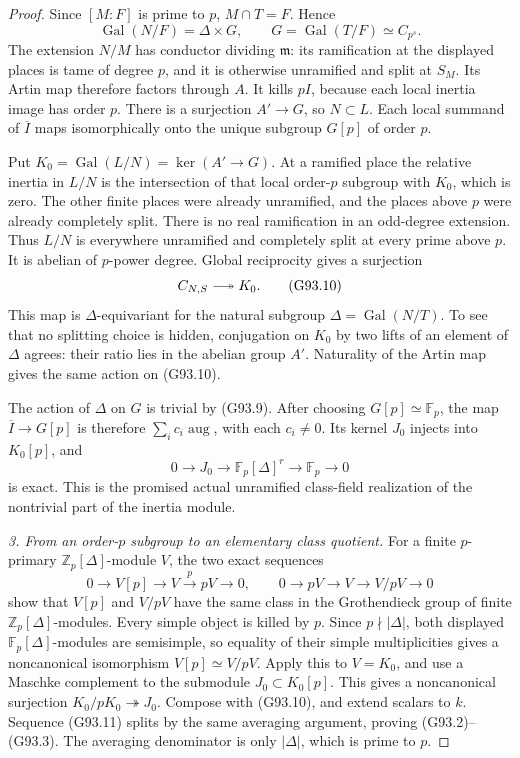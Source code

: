 \begin{proof}
Since \([M:F]\) is prime to \(p\), \(M\cap T=F\).  Hence
\[
 \operatorname{Gal}(N/F)=\Delta\times G,
 \qquad G=\operatorname{Gal}(T/F)\simeq C_{p^s}.
 \tag{G93.9}
\]
The extension \(N/M\) has conductor dividing \(\mathfrak m\):
its ramification at the displayed places is tame of degree \(p\),
and it is otherwise unramified and split at \(S_M\).
Its Artin map therefore factors through \(A\).  It kills \(pI\),
because each local inertia image has order \(p\).
There is a surjection \(A'\to G\), so \(N\subset L\).
Each local summand of \(\overline I\) maps isomorphically onto
the unique subgroup \(G[p]\) of order \(p\).

Put \(K_0=\operatorname{Gal}(L/N)=\ker(A'\to G)\).
At a ramified place the relative inertia in \(L/N\) is the
intersection of that local order-\(p\) subgroup with \(K_0\),
which is zero.  The other finite places were already unramified,
and the places above \(p\) were already completely split.
There is no real ramification in an odd-degree extension.
Thus \(L/N\) is everywhere unramified and completely split at
every prime above \(p\).  It is abelian of \(p\)-power degree.
Global reciprocity gives a surjection
\[
 C_{N,S}\longtwoheadrightarrow K_0.
 \tag{G93.10}
\]
This map is \(\Delta\)-equivariant for the natural subgroup
\(\Delta=\operatorname{Gal}(N/T)\).  To see that no splitting
choice is hidden, conjugation on \(K_0\) by two lifts of an
element of \(\Delta\) agrees: their ratio lies in the abelian
group \(A'\).  Naturality of the Artin map gives the same action
on (G93.10).

The action of \(\Delta\) on \(G\) is trivial by (G93.9).
After choosing \(G[p]\simeq\mathbb F_p\), the map
\(\overline I\to G[p]\) is therefore
\(\sum_i c_i\operatorname{aug}\), with each \(c_i\ne0\).
Its kernel \(J_0\) injects into \(K_0[p]\), and
\[
 0\longrightarrow J_0\longrightarrow
 \mathbb F_p[\Delta]^r\longrightarrow\mathbb F_p
 \longrightarrow0
 \tag{G93.11}
\]
is exact.  This is the promised actual unramified class-field
realization of the nontrivial part of the inertia module.

\emph{3. From an order-\(p\) subgroup to an elementary class quotient.}
For a finite \(p\)-primary \(\mathbb Z_p[\Delta]\)-module \(V\),
the two exact sequences
\[
 0\to V[p]\to V\xrightarrow{p}pV\to0,
 \qquad
 0\to pV\to V\to V/pV\to0
 \tag{G93.12}
\]
show that \(V[p]\) and \(V/pV\) have the same class in the
Grothendieck group of finite \(\mathbb Z_p[\Delta]\)-modules.
Every simple object is killed by \(p\).  Since
\(p\nmid|\Delta|\), both displayed \(\mathbb F_p[\Delta]\)-modules
are semisimple, so equality of their simple multiplicities gives
a noncanonical isomorphism \(V[p]\simeq V/pV\).
Apply this to \(V=K_0\), and use a Maschke complement to the
submodule \(J_0\subset K_0[p]\).  This gives a noncanonical
surjection \(K_0/pK_0\twoheadrightarrow J_0\).
Compose with (G93.10), and extend scalars to \(k\).
Sequence (G93.11) splits by the same averaging argument, proving
(G93.2)--(G93.3).  The averaging denominator is only
\(|\Delta|\), which is prime to \(p\).


\end{proof}
